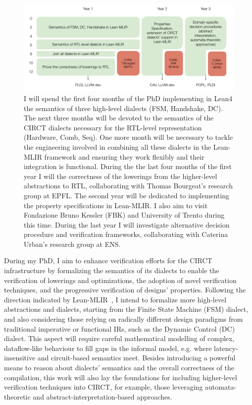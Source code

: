 \documentclass[sigconf,authorversion,nonacm, 11pt]{acmart}
\begin{document}
\begin{figure}[ht]
    \includegraphics[scale=0.8]{logistics.pdf}
    \caption{I will spend the first four months of the PhD implementing in Lean4 the semantics of three high-level dialects (FSM, Handshake, DC).
    The next three months will be devoted to the semantics of the CIRCT dialects necessary for the RTL-level representation (Hardware, Comb, Seq). 
    One more month will be necessary to tackle the engineering involved in combining all these dialects in the Lean-MLIR framework and ensuring they work 
    flexibly and their integration is functional. During the the last four months of the first year I will the correctness of the lowerings from the higher-level 
    abstractions to RTL, collaborating with Thomas Bourgeat's research group at EPFL. 
    The second year will be dedicated to implementing the property specifications in Lean-MLIR. I also aim to visit Fondazione Bruno Kessler (FBK) and University of Trento 
    during this time. 
    During the last year I will investigate alternative decision procedure and verification frameworks, collaborating with 
    Caterina Urban's research group at ENS.
    }
    \label{fig:logistics}
\end{figure}

During my PhD, I aim to enhance verification efforts for the CIRCT infrastructure by formalizing the semantics of its dialects 
to enable the verification of lowerings and optimizations, the adoption of novel verification techniques, 
and the progressive verification of designs' properties. 
Following the direction indicated by Lean-MLIR~\cite{bhat2024verifying}, I intend to formalize more high-level abstractions and dialects, 
starting from the Finite State Machine (FSM) dialect, and also considering those relying on radically different design paradigms 
from traditional imperative or functional IRs, such as the Dynamic Control (DC) dialect. 
This aspect will require careful mathematical modelling of complex, dataflow-like behaviour to fill gaps in the informal model, e.g. where latency-insensitive and 
circuit-based semantics meet. 
Besides introducing a powerful means to reason about dialects' semantics and the overall correctness of the compilation, 
this work will also lay the foundations for including higher-level verification techniques into CIRCT, for example, those leveraging automata-theoretic 
and abstract-interpretation-based approaches. 
\end{document}
